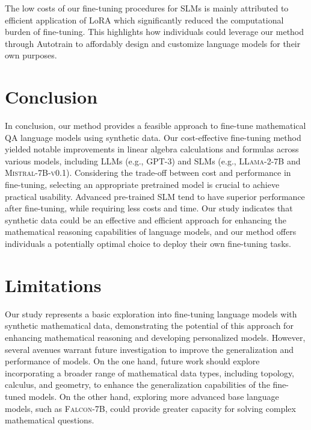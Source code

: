 \documentclass[10pt]{article}
\begin{document}
The low costs of our fine-tuning procedures for SLMs is mainly attributed to efficient application of LoRA \cite{Hu2021LoRALA} which significantly reduced the computational burden of fine-tuning. This highlights how individuals could leverage our method through Autotrain to affordably design and customize language models for their own purposes.

\section{Conclusion}
In conclusion, our method provides a feasible approach to fine-tune mathematical QA language models using synthetic data. Our cost-effective fine-tuning method yielded notable improvements in linear algebra calculations and formulas across various models, including LLMs (e.g., \textsc{GPT-3}) and SLMs (e.g., \textsc{LLama-2-7B} and \textsc{Mistral-7B-v0.1}). Considering the trade-off between cost and performance in fine-tuning, selecting an appropriate pretrained model is crucial to achieve practical usability. Advanced pre-trained SLM tend to have superior performance after fine-tuning, while requiring less costs and time. Our study indicates that synthetic data could be an effective and efficient approach for enhancing the mathematical reasoning capabilities of language models, and our method offers individuals a potentially optimal choice to deploy their own fine-tuning tasks.  

\section{Limitations}
Our study represents a basic exploration into fine-tuning language models with synthetic mathematical data, demonstrating the potential of this approach for enhancing mathematical reasoning and developing personalized models. However, several avenues warrant future investigation to improve the generalization and performance of models. On the one hand, future work should explore incorporating a broader range of mathematical data types, including topology, calculus, and geometry, to enhance the generalization capabilities of the fine-tuned models. On the other hand, exploring more advanced base language models, such as \textsc{Falcon-7B}, could provide greater capacity for solving complex mathematical questions.

\newpage
\printbibliography
\end{document}
